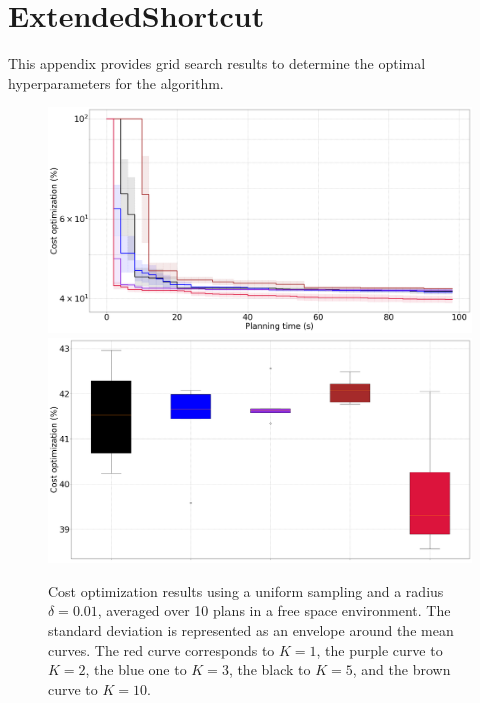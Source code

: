 \chapter{ExtendedShortcut}\label{chap:appendixC}

This appendix provides grid search results to determine the optimal hyperparameters for the  algorithm.

\begin{figure} [htp]
    \centering
    \includegraphics[width=0.9\linewidth]{figures/appendix/uniform_radius_0_01.png} \\
    \includegraphics[width=0.9\linewidth]{figures/appendix/bplot_uniform_radius_0_01.png}
    \caption{Cost optimization results using a uniform sampling and a radius $\delta = 0.01$, averaged over 10 plans in a free space environment. 
    The standard deviation is represented as an envelope around the mean curves.
    The red curve corresponds to $K = 1$, the purple curve to $K = 2$, the blue one to $K = 3$, the black to $K = 5$, and the brown curve to $K = 10$.}%
    \label{fig:uniform_radius_0_01}%
\end{figure}

